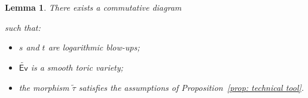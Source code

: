 \documentclass{article}
\def\Ev{{\mathsf{Ev}}}
\newtheorem{lemma}[definition]{Lemma}
\begin{document}
\begin{lemma}
    There exists a commutative diagram
\begin{center}
\end{center}
such that:
\begin{itemize}
\item $s$ and $t$ are logarithmic blow-ups;
\item $\widetilde{\Ev}$ is a smooth toric variety;
\item the morphism $\widetilde{\tau}$ satisfies the assumptions of Proposition~\ref{prop: technical tool}.
\end{itemize}

\end{lemma}
\end{document}
